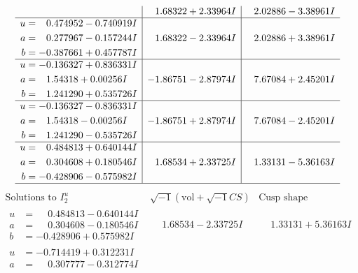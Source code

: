\documentclass[1p]{elsarticle_modified}
\theoremstyle{definition}
\newcommand{\I}{\sqrt{-1}}
\begin{document}
$$\begin{array}{c|c|c}
 & \phantom{-}1.68322 + 2.33964 I & \phantom{-}2.02886 - 3.38961 I \\ \hline\begin{aligned}
u &= \phantom{-}0.474952 - 0.740919 I \\
a &= \phantom{-}0.277967 - 0.157244 I \\
b &= -0.387661 + 0.457787 I\end{aligned}
 & \phantom{-}1.68322 - 2.33964 I & \phantom{-}2.02886 + 3.38961 I \\ \hline\begin{aligned}
u &= -0.136327 + 0.836331 I \\
a &= \phantom{-}1.54318 + 0.00256 I \\
b &= \phantom{-}1.241290 + 0.535726 I\end{aligned}
 & -1.86751 - 2.87974 I & \phantom{-}7.67084 + 2.45201 I \\ \hline\begin{aligned}
u &= -0.136327 - 0.836331 I \\
a &= \phantom{-}1.54318 - 0.00256 I \\
b &= \phantom{-}1.241290 - 0.535726 I\end{aligned}
 & -1.86751 + 2.87974 I & \phantom{-}7.67084 - 2.45201 I \\ \hline\begin{aligned}
u &= \phantom{-}0.484813 + 0.640144 I \\
a &= \phantom{-}0.304608 + 0.180546 I \\
b &= -0.428906 - 0.575982 I\end{aligned}
 & \phantom{-}1.68534 + 2.33725 I & \phantom{-}1.33131 - 5.36163 I\\
 \hline 
 \end{array}$$\newpage$$\begin{array}{c|c|c}  
\text{Solutions to }I^u_{2}& \I (\text{vol} + \sqrt{-1}CS) & \text{Cusp shape}\\
 \hline 
\begin{aligned}
u &= \phantom{-}0.484813 - 0.640144 I \\
a &= \phantom{-}0.304608 - 0.180546 I \\
b &= -0.428906 + 0.575982 I\end{aligned}
 & \phantom{-}1.68534 - 2.33725 I & \phantom{-}1.33131 + 5.36163 I \\ \hline\begin{aligned}
u &= -0.714419 + 0.312231 I \\
a &= \phantom{-}0.307777 - 0.312774 I \\

\end{aligned}
\end{array}$$
\end{document}
